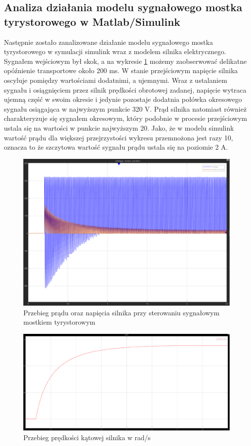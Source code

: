 \documentclass[11pt]{article}
\begin{document}
\subsection{Analiza działania modelu sygnałowego mostka tyrystorowego w Matlab/Simulink}
Następnie zostało zanalizowane działanie modelu sygnałowego mostka tyrystorowego w symulacji simulink wraz z modelem silnika elektrycznego. Sygnałem wejściowym był skok, a na wykresie \ref{fig:smt_VandMC} możemy zaobserwować delikatne opóźnienie transportowe około 200 ms. W stanie przejściowym napięcie silnika oscyluje pomiędzy wartościami dodatnimi, a ujemnymi. Wraz z ustalaniem sygnału i osiągnięciem przez silnik prędkości obrotowej zadanej, napięcie wytraca ujemną część w swoim okresie i jedynie pozostaje dodatnia połówka okresowego sygnału osiągająca w najwyższym punkcie 320 V. Prąd silnika natomiast również charakteryzuje się sygnałem okresowym, który podobnie w procesie przejściowym ustala się na wartości w punkcie najwyższym 20. Jako, że w modelu simulink wartość prądu dla większej przejrzystości wykresu przemnożona jest razy 10, oznacza to że szczytowa wartość sygnału prądu ustala się na poziomie 2 A.
\begin{figure}[H]
    \centering
    \includegraphics[width=1\linewidth]{aun1_smt_VandMC.png}
    \caption{Przebieg prądu oraz napięcia silnika przy sterowaniu sygnałowym mostkiem tyrystorowym}
    \label{fig:smt_VandMC}
\end{figure}
\begin{figure}[H]
    \centering
    \includegraphics[width=1\linewidth]{aun1_smt_wPV.png}
    \caption{Przebieg prędkości kątowej silnika w rad/s}
    \label{fig:smt_wPV}
\end{figure}
\end{document}

